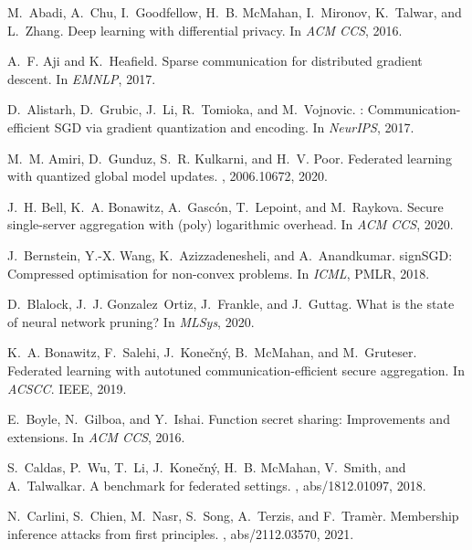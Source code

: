 \documentclass[11pt]{article}
\begin{document}
\begin{thebibliography}{10}
\setlength{\itemsep}{1pt}
\begin{small}
M.~Abadi, A.~Chu, I.~Goodfellow, H.~B. McMahan, I.~Mironov, K.~Talwar, and
  L.~Zhang.
\newblock Deep learning with differential privacy.
\newblock In {\em ACM CCS}, 2016.

A.~F. Aji and K.~Heafield.
\newblock Sparse communication for distributed gradient descent.
\newblock In {\em EMNLP}, 2017.

D.~Alistarh, D.~Grubic, J.~Li, R.~Tomioka, and M.~Vojnovic.
: {C}ommunication-efficient {SGD} via gradient quantization and
  encoding.
\newblock In {\em NeurIPS}, 2017.

M.~M. Amiri, D.~Gunduz, S.~R. Kulkarni, and H.~V. Poor.
\newblock Federated learning with quantized global model updates.
, 2006.10672, 2020.

J.~H. Bell, K.~A. Bonawitz, A.~Gasc{\'o}n, T.~Lepoint, and M.~Raykova.
\newblock Secure single-server aggregation with (poly) logarithmic overhead.
\newblock In {\em ACM CCS}, 2020.

J.~Bernstein, Y.-X. Wang, K.~Azizzadenesheli, and A.~Anandkumar.
\newblock sign{SGD}: {C}ompressed optimisation for non-convex problems.
\newblock In {\em ICML}, PMLR, 2018.

D.~Blalock, J.~J. Gonzalez~Ortiz, J.~Frankle, and J.~Guttag.
\newblock What is the state of neural network pruning?
\newblock In {\em MLSys}, 2020.

K.~A. Bonawitz, F.~Salehi, J.~Kone{\v{c}}n{\'y}, B.~McMahan, and M.~Gruteser.
\newblock Federated learning with autotuned communication-efficient secure
  aggregation.
\newblock In {\em ACSCC}. {IEEE}, 2019.

E.~Boyle, N.~Gilboa, and Y.~Ishai.
\newblock Function secret sharing: Improvements and extensions.
\newblock In {\em ACM CCS}, 2016.

S.~Caldas, P.~Wu, T.~Li, J.~Kone{\v{c}}n{\'y}, H.~B. McMahan, V.~Smith, and
  A.~Talwalkar.
 {A} benchmark for federated settings.
, abs/1812.01097, 2018.

N.~Carlini, S.~Chien, M.~Nasr, S.~Song, A.~Terzis, and F.~Tram{\`{e}}r.
\newblock Membership inference attacks from first principles.
, abs/2112.03570, 2021.


\end{small}
\end{thebibliography}
\end{document}
